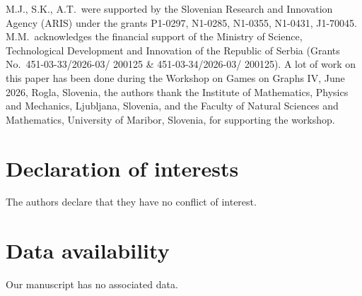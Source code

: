 \documentclass[12pt]{article}
\begin{document}
M.J., S.K., A.T.\ were supported by the Slovenian Research and Innovation Agency (ARIS) under the grants  P1-0297, N1-0285, N1-0355, N1-0431, J1-70045. M.M.\ acknowledges the financial support of the Ministry of Science, Technological Development and Innovation of the Republic of Serbia (Grants No.\ 451-03-33/2026-03/ 200125 \& 451-03-34/2026-03/ 200125). A lot of work on this paper has been done during the Workshop on Games on Graphs IV, June 2026, Rogla, Slovenia, the authors thank the Institute of Mathematics, Physics and Mechanics, Ljubljana, Slovenia, and the Faculty of Natural Sciences and Mathematics, University of Maribor, Slovenia, for supporting the workshop. 

\section*{Declaration of interests}
 
The authors declare that they have no conflict of interest. 

\section*{Data availability}
 
Our manuscript has no associated data.
\end{document}
